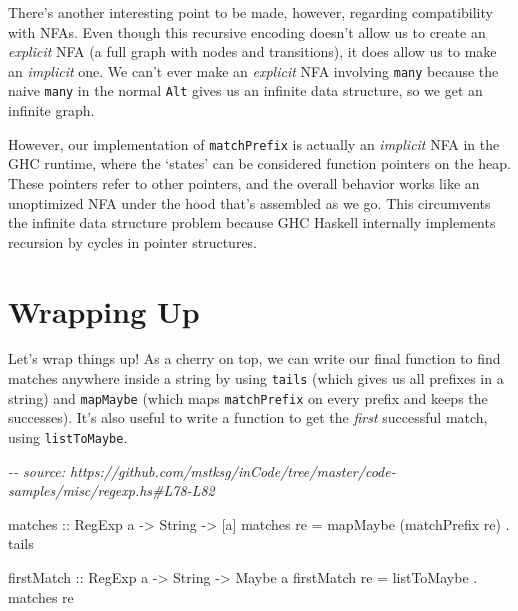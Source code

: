 \documentclass[]{article}
\newenvironment{Shaded}{}{}
\newcommand{\CommentTok}[1]{\textcolor[rgb]{0.38,0.63,0.69}{\textit{#1}}}
\newcommand{\DataTypeTok}[1]{\textcolor[rgb]{0.56,0.13,0.00}{#1}}
\newcommand{\NormalTok}[1]{#1}
\newcommand{\OperatorTok}[1]{\textcolor[rgb]{0.40,0.40,0.40}{#1}}
\newcommand{\OtherTok}[1]{\textcolor[rgb]{0.00,0.44,0.13}{#1}}
\begin{document}
There's another interesting point to be made, however, regarding compatibility
with NFAs. Even though this recursive encoding doesn't allow us to create an
\emph{explicit} NFA (a full graph with nodes and transitions), it does allow us
to make an \emph{implicit} one. We can't ever make an \emph{explicit} NFA
involving \texttt{many} because the naive \texttt{many} in the normal
\texttt{Alt} gives us an infinite data structure, so we get an infinite graph.

However, our implementation of \texttt{matchPrefix} is actually an
\emph{implicit} NFA in the GHC runtime, where the `states' can be considered
function pointers on the heap. These pointers refer to other pointers, and the
overall behavior works like an unoptimized NFA under the hood that's assembled
as we go. This circumvents the infinite data structure problem because GHC
Haskell internally implements recursion by cycles in pointer structures.

\hypertarget{wrapping-up}{%
\section{Wrapping Up}\label{wrapping-up}}

Let's wrap things up! As a cherry on top, we can write our final function to
find matches anywhere inside a string by using \texttt{tails} (which gives us
all prefixes in a string) and \texttt{mapMaybe} (which maps \texttt{matchPrefix}
on every prefix and keeps the successes). It's also useful to write a function
to get the \emph{first} successful match, using \texttt{listToMaybe}.

\begin{Shaded}
\begin{Highlighting}[]
\CommentTok{{-}{-} source: https://github.com/mstksg/inCode/tree/master/code{-}samples/misc/regexp.hs\#L78{-}L82}

\OtherTok{matches ::} \DataTypeTok{RegExp}\NormalTok{ a }\OtherTok{{-}>} \DataTypeTok{String} \OtherTok{{-}>}\NormalTok{ [a]}
\NormalTok{matches re }\OtherTok{=}\NormalTok{ mapMaybe (matchPrefix re) }\OperatorTok{.}\NormalTok{ tails}

\OtherTok{firstMatch ::} \DataTypeTok{RegExp}\NormalTok{ a }\OtherTok{{-}>} \DataTypeTok{String} \OtherTok{{-}>} \DataTypeTok{Maybe}\NormalTok{ a}
\NormalTok{firstMatch re }\OtherTok{=}\NormalTok{ listToMaybe }\OperatorTok{.}\NormalTok{ matches re}
\end{Highlighting}
\end{Shaded}
\end{document}
